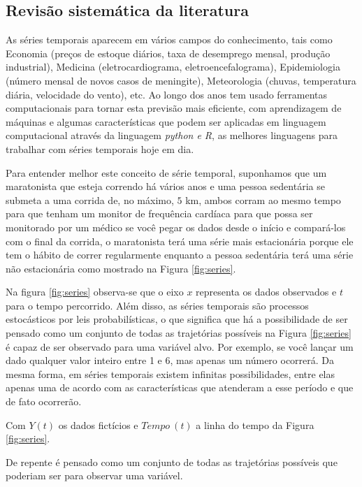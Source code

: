 \subsection{Revis\~ao sistem\'atica da literatura} \label{subsec:revisão}

As séries temporais aparecem em vários campos do conhecimento, tais como Economia (preços de estoque diários, taxa de desemprego mensal, produção industrial), Medicina (eletrocardiograma, eletroencefalograma), Epidemiologia (número mensal de novos casos de meningite), Meteorologia (chuvas, temperatura diária, velocidade do vento), etc. Ao longo dos anos tem usado ferramentas computacionais para tornar esta previsão mais eficiente, com aprendizagem de máquinas e algumas características que podem ser aplicadas em linguagem computacional através da linguagem \textit{python e R}, as melhores linguagens para trabalhar com séries temporais hoje em dia.

Para entender melhor este conceito de série temporal, suponhamos que um maratonista que esteja correndo há vários anos e uma pessoa sedentária se submeta a uma corrida de, no máximo, $5$ km, ambos corram ao mesmo tempo para que tenham um monitor de frequência cardíaca para que possa ser monitorado por um médico se você pegar os dados desde o início e compará-los com o final da corrida, o maratonista terá uma série mais estacionária porque ele tem o hábito de correr regularmente enquanto a pessoa sedentária terá uma série não estacionária como mostrado na Figura \ref{fig:series}.




Na figura \ref{fig:series} observa-se que o eixo $x$ representa os dados observados e $t$ para o tempo percorrido.
Além disso, as séries temporais são processos estocásticos por leis probabilísticas, o que significa que há a possibilidade de ser pensado como um conjunto de todas as trajetórias possíveis na Figura \ref{fig:series} é capaz de ser observado para uma variável alvo. Por exemplo, se você lançar um dado qualquer valor inteiro entre 1 e 6, mas apenas um número ocorrerá. Da mesma forma, em séries temporais existem infinitas possibilidades, entre elas apenas uma de acordo com as características que atenderam a esse período e que de fato ocorrerão.



Com $Y(t)$ os dados fictícios e $Tempo \ (t)$ a linha do tempo da Figura \ref{fig:series}.

De repente é pensado como um conjunto de todas as trajetórias possíveis que poderiam ser para observar uma variável.


